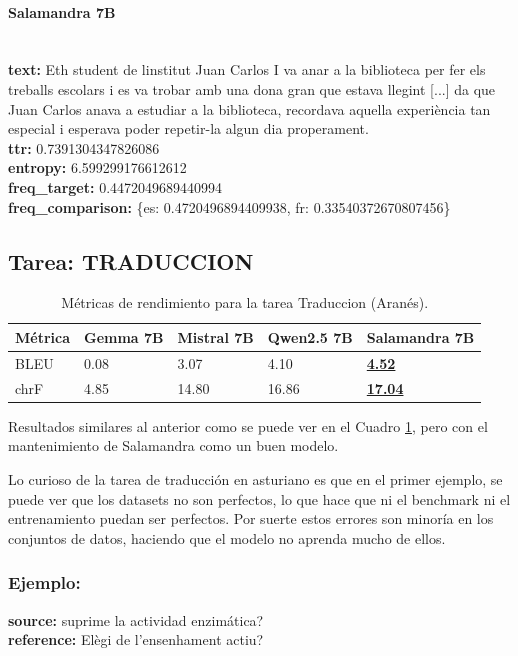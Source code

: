 \paragraph{Salamandra 7B}~\\
\textbf{text:} Eth student de l\textquotesingle{}institut Juan Carlos I va anar a la biblioteca per fer els treballs escolars i es va trobar amb una dona gran que estava llegint  [...] da que Juan Carlos anava a estudiar a la biblioteca, recordava aquella experiència tan especial i esperava poder repetir-la algun dia properament.\\
\textbf{ttr:} 0.7391304347826086\\
\textbf{entropy:} 6.599299176612612\\
\textbf{freq\_target:} 0.4472049689440994\\
\textbf{freq\_comparison:} \{\textquotesingle{}es\textquotesingle{}: 0.4720496894409938, \textquotesingle{}fr\textquotesingle{}: 0.33540372670807456\}

\subsection{Tarea: TRADUCCION}\label{tarea-traduccion}
\begin{longtable}[]{@{}lllll@{}}
\toprule\noalign{}
Métrica & Gemma 7B & Mistral 7B & Qwen2.5 7B & Salamandra 7B \\
\midrule\noalign{}
\endhead
\bottomrule\noalign{}
\caption{Métricas de rendimiento para la tarea Traduccion (Aranés).}
\label{tab:metricas_traduccion_Aranés}
\endlastfoot
BLEU & 0.08 & 3.07 & 4.10 & \textbf{\underline{4.52}} \\
chrF & 4.85 & 14.80 & 16.86 & \textbf{\underline{17.04}} \\
\end{longtable}
Resultados similares al anterior como se puede ver en el Cuadro \ref{tab:metricas_traduccion_Aranés}, pero con el mantenimiento de Salamandra como un buen modelo.

Lo curioso de la tarea de traducción en asturiano es que en el primer ejemplo, se puede ver que los datasets no son perfectos, lo que hace que ni el benchmark ni el entrenamiento puedan ser perfectos. Por suerte estos errores son minoría en los conjuntos de datos, haciendo que el modelo no aprenda mucho de ellos.

\subsubsection{Ejemplo:}
\textbf{source:} suprime la actividad enzimática?\\
\textbf{reference:} Elègi de l’ensenhament actiu?

